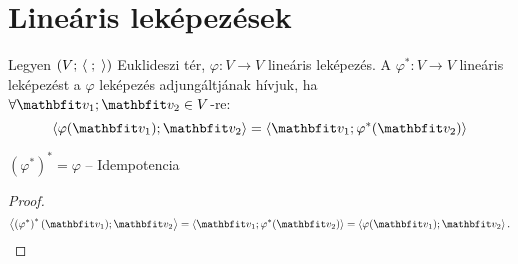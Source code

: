 \clearpage
\section{Lineáris leképezések}

\begin{definition}
  Legyen $(V; \, \left\langle\;;\;\right\rangle)$ Euklideszi tér, $\varphi: V \rightarrow V$
  lineáris leképezés. A $\varphi^* : V \rightarrow V$ lineáris leképezést
  a $\varphi$ leképezés adjungáltjának hívjuk, ha
  $\forall \rvec v_1; \rvec v_2 \in V$-re:
  $$
    \scalar{\varphi(\rvec v_1)}{\rvec v_2}
    = \scalar{\rvec v_1}{\varphi^*(\rvec v_2)}
  $$
\end{definition}

\begin{statement}
  $\left( \varphi^* \right)^* = \varphi$ -- Idempotencia

  \begin{proof}
    \vspace{-2em}
    $$
      \scalar{\left( \varphi^* \right)^*(\rvec v_1)}{\rvec v_2}
      = \scalar{\rvec v_1}{\varphi^*(\rvec v_2)}
      = \scalar{\varphi(\rvec v_1)}{\rvec v_2}
      \text.
    $$
  \end{proof}
\end{statement}

